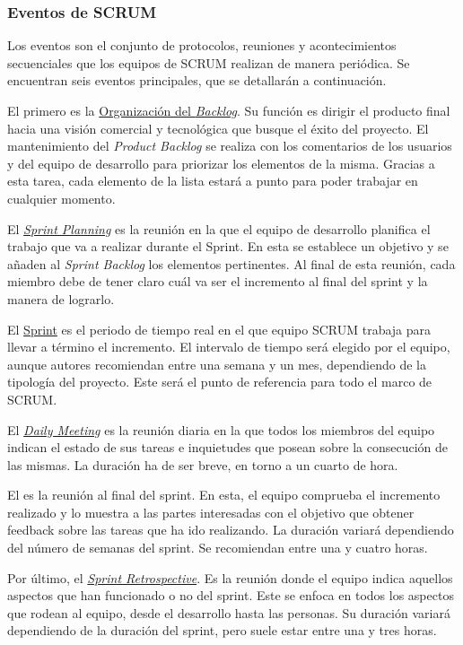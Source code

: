 \subsubsection{Eventos de SCRUM}

Los eventos son el conjunto de protocolos, reuniones y acontecimientos secuenciales que los equipos de SCRUM realizan de manera periódica. Se encuentran seis eventos principales, que se detallarán a continuación.

El primero es la \underline{Organización del \textit{Backlog}}. Su función es dirigir el producto final hacia una visión comercial y tecnológica que busque el éxito del proyecto. El mantenimiento del \textit{Product Backlog} se realiza con los comentarios de los usuarios y del equipo de desarrollo para priorizar los elementos de la misma. Gracias a esta tarea, cada elemento de la lista estará a punto para poder trabajar en cualquier momento.

El \underline{\textit{Sprint Planning}} es la reunión en la que el equipo de desarrollo planifica el trabajo que va a realizar durante el Sprint. En esta se establece un objetivo y se añaden al \textit{Sprint Backlog} los elementos pertinentes. Al final de esta reunión, cada miembro debe de tener claro cuál va ser el incremento al final del sprint y la manera de lograrlo.

El \underline{Sprint} es el periodo de tiempo real en el que equipo SCRUM trabaja para llevar a término el incremento. El intervalo de tiempo será elegido por el equipo, aunque autores recomiendan entre una semana y un mes, dependiendo de la tipología del proyecto. Este será el punto de referencia para todo el marco de SCRUM.

El \underline{\textit{Daily Meeting}} es la reunión diaria en la que todos los miembros del equipo indican el estado de sus tareas e inquietudes que posean sobre la consecución de las mismas. La duración ha de ser breve, en torno a un cuarto de hora.

El \underline{} es la reunión al final del sprint. En esta, el equipo comprueba el incremento realizado y lo muestra a las partes interesadas con el objetivo que obtener feedback sobre las tareas que ha ido realizando. La duración variará dependiendo del número de semanas del sprint. Se recomiendan entre una y cuatro horas.

Por último, el \underline{\textit{Sprint Retrospective}}. Es la reunión donde el equipo indica aquellos aspectos que han funcionado o no del sprint. Este se enfoca en todos los aspectos que rodean al equipo, desde el desarrollo hasta las personas. Su duración variará dependiendo de la duración del sprint, pero suele estar entre una y tres horas.


